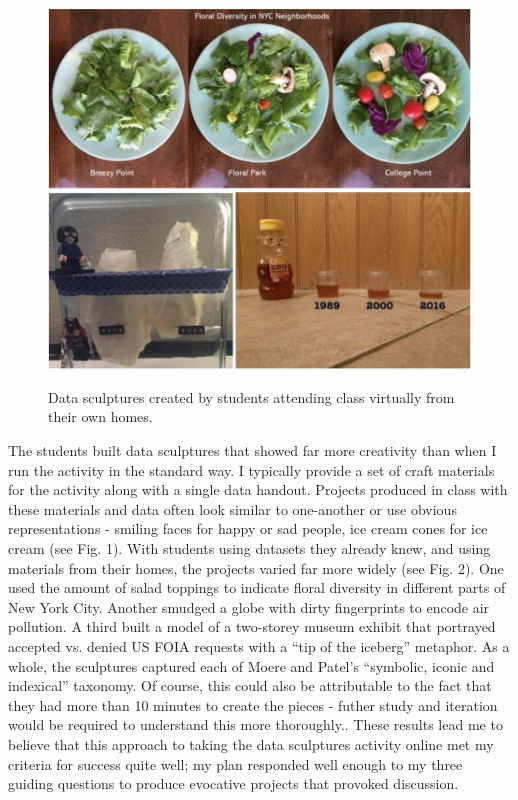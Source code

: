 \documentclass[journal]{vgtc}                %
\begin{document}
\begin{figure}[h]
  \centering
  \includegraphics[scale=0.28]{figures/sculptures-at-home.jpg}
  \label{fig:sculptures_at_home}
  \setlength{\abovecaptionskip}{-7pt}
  \caption{Data sculptures created by students attending class virtually from their own homes.}
\end{figure}

The students built  data sculptures that showed far more creativity than when I run the activity in the standard way. I typically provide a set of craft materials for the activity along with a single data handout. Projects produced in class with these materials and data often look similar to one-another or use obvious representations - smiling faces for happy or sad people, ice cream cones for ice cream (see Fig. 1). With students using datasets they already knew, and using materials from their homes, the projects varied far more widely (see Fig. 2). One used the amount of salad toppings to indicate floral diversity in different parts of New York City. Another smudged a globe with dirty fingerprints to encode air pollution. A third built a model of a two-storey museum exhibit that portrayed accepted vs. denied US FOIA requests with a “tip of the iceberg” metaphor. As a whole, the sculptures captured each of Moere and Patel's “symbolic, iconic and indexical” taxonomy\cite{moere_physical_2009}. Of course, this could also be attributable to the fact that they had more than 10 minutes to create the pieces - futher study and iteration would be required to understand this more thoroughly.. These results lead me to believe that this approach to taking the data sculptures activity online met my criteria for success quite well; my plan responded well enough to my three guiding questions to produce evocative projects that provoked discussion.
\end{document}
